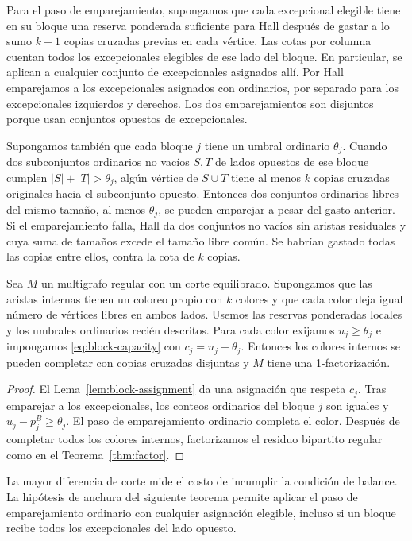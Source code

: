 Para el paso de emparejamiento, supongamos que cada excepcional elegible tiene en su bloque una reserva ponderada suficiente para Hall después de gastar a lo sumo \(k-1\) copias cruzadas previas en cada vértice. Las cotas por columna cuentan todos los excepcionales elegibles de ese lado del bloque. En particular, se aplican a cualquier conjunto de excepcionales asignados allí. Por Hall emparejamos a los excepcionales asignados con ordinarios, por separado para los excepcionales izquierdos y derechos. Los dos emparejamientos son disjuntos porque usan conjuntos opuestos de excepcionales.

Supongamos también que cada bloque \(j\) tiene un umbral ordinario \(\theta_j\). Cuando dos subconjuntos ordinarios no vacíos \(S,T\) de lados opuestos de ese bloque cumplen \(|S|+|T|>\theta_j\), algún vértice de \(S\cup T\) tiene al menos \(k\) copias cruzadas originales hacia el subconjunto opuesto. Entonces dos conjuntos ordinarios libres del mismo tamaño, al menos \(\theta_j\), se pueden emparejar a pesar del gasto anterior. Si el emparejamiento falla, Hall da dos conjuntos no vacíos sin aristas residuales y cuya suma de tamaños excede el tamaño libre común. Se habrían gastado todas las copias entre ellos, contra la cota de \(k\) copias.

\begin{corollary}\label{cor:block-factorization}
Sea \(M\) un multigrafo regular con un corte equilibrado. Supongamos que las aristas internas tienen un coloreo propio con \(k\) colores y que cada color deja igual número de vértices libres en ambos lados. Usemos las reservas ponderadas locales y los umbrales ordinarios recién descritos. Para cada color exijamos \(u_j\ge\theta_j\) e impongamos \eqref{eq:block-capacity} con \(c_j=u_j-\theta_j\). Entonces los colores internos se pueden completar con copias cruzadas disjuntas y \(M\) tiene una 1-factorización.
\end{corollary}

\begin{proof}
El Lema~\ref{lem:block-assignment} da una asignación que respeta \(c_j\). Tras emparejar a los excepcionales, los conteos ordinarios del bloque \(j\) son iguales y \(u_j-p^B_j\ge\theta_j\). El paso de emparejamiento ordinario completa el color. Después de completar todos los colores internos, factorizamos el residuo bipartito regular como en el Teorema~\ref{thm:factor}.
\end{proof}

La mayor diferencia de corte mide el costo de incumplir la condición de balance. La hipótesis de anchura del siguiente teorema permite aplicar el paso de emparejamiento ordinario con cualquier asignación elegible, incluso si un bloque recibe todos los excepcionales del lado opuesto.


